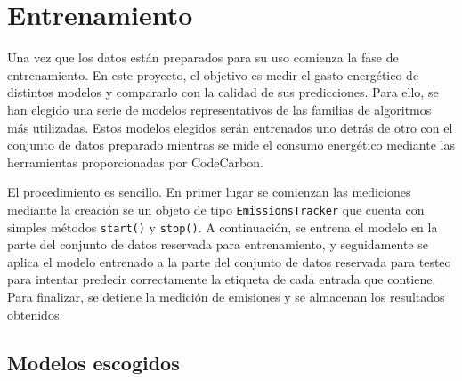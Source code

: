 \section{Entrenamiento}

Una vez que los datos están preparados para su uso comienza la fase de entrenamiento. En este proyecto, el objetivo es medir el gasto energético de distintos modelos y compararlo con la calidad de sus predicciones. Para ello, se han elegido una serie de modelos representativos de las familias de algoritmos más utilizadas. Estos modelos elegidos serán entrenados uno detrás de otro con el conjunto de datos preparado mientras se mide el consumo energético mediante las herramientas proporcionadas por CodeCarbon.

El procedimiento es sencillo. En primer lugar se comienzan las mediciones mediante la creación se un objeto de tipo \texttt{EmissionsTracker} que cuenta con simples métodos \texttt{start()} y \texttt{stop()}. A continuación, se entrena el modelo en la parte del conjunto de datos reservada para entrenamiento, y seguidamente se aplica el modelo entrenado a la parte del conjunto de datos reservada para testeo para intentar predecir correctamente la etiqueta de cada entrada que contiene. Para finalizar, se detiene la medición de emisiones y se almacenan los resultados obtenidos.


\subsection{Modelos escogidos}
\label{subsec:models-short}

